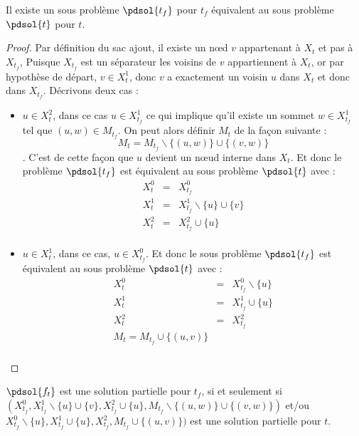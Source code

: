 \begin{nlemma}
    Il existe un sous problème $\pdsol{t_f}$ pour $t_f$ équivalent au sous problème $\pdsol{t}$ pour
    $t$.
\end{nlemma}

\begin{proof}
    Par définition du sac ajout, il existe un n\oe d $v$ appartenant à $X_t$ et pas à $X_{t_f}$,
    Puisque $X_{t_f}$ est un séparateur les voisins de $v$ appartiennent à $X_t$, or par hypothèse
    de départ, $v \in X_t^1$, donc $v$ a exactement un voisin $u$ dans $X_t$ et donc dans $X_{t_f}$.
    Décrivons deux cas :
    \begin{itemize}
        \item $u \in X_t^2$, dans ce cas $u \in X_{t_f}^1$ ce qui implique qu'il existe un sommet $w
            \in X_{t_f}^1$ tel que $(u,w) \in M_{t_f}$. On peut alors définir $M_t$ de la façon
            suivante : \[
                M_t = M_{t_f} \backslash \{(u,w)\} \cup \{(v,w)\}
            \]. C'est de cette façon que $u$ devient un n\oe ud interne dans $X_t$. Et donc le
            problème $\pdsol{t_f}$ est équivalent au sous problème $\pdsol{t}$ avec :
            \[
                \begin{array}{rcl}
                    X_t^0 & = & X_{t_f}^0 \\
                    X_t^1 & = & X_{t_f}^1 \backslash \{u\} \cup \{v\}\\
                    X_t^2 & = & X_{t_f}^2 \cup \{u\}\\
                \end{array}
            \]
        \item $u \in X_t^1$, dans ce cas, $u \in X_{t_f}^0$. Et donc le sous problème $\pdsol{t_f}$
            est équivalent au sous problème $\pdsol{t}$ avec :
            \[
                \begin{array}{rcl}
                    X_t^0 & = & X_{t_f}^0 \backslash \{u\} \\
                    X_t^1 & = & X_{t_f}^1 \cup \{u\}\\
                    X_t^2 & = & X_{t_f}^2\\
                    M_t = M_{t_f} \cup \{(u, v)\}\\
                \end{array}
            \]
    \end{itemize}
\end{proof}

\begin{ncorol}
    $\pdsol{f_t}$ est une solution partielle pour $t_f$, si et seulement si $(X_{t_f}^0, X_{t_f}^1
    \backslash \{u\} \cup \{v\},X_{t_f}^2 \cup \{u\},M_{t_f} \backslash \{(u,w)\} \cup \{(v,w)\})$
    et/ou $X_{t_f}^0 \backslash \{u\}, X_{t_f}^1 \cup \{u\}, X_{t_f}^2, M_{t_f} \cup \{(u, v)\})$ est
    une solution partielle pour $t$.
\end{ncorol}

